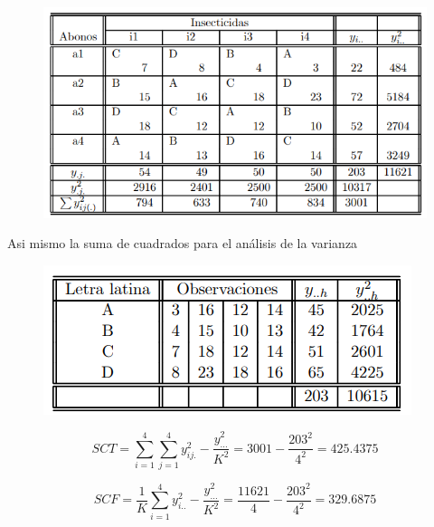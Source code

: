 \begin{figure}[H]
    \begin{tcolorbox}[colback=white, colframe=black, boxrule=1.5pt, sharp corners=all]
          \begin{center}
            {\includegraphics[scale=1]{images/img2.png}}
          \end{center}
        \end{tcolorbox}
\end{figure}

Asi mismo la suma de cuadrados para el análisis de la varianza

\begin{figure}[H]
    \begin{tcolorbox}[colback=white, colframe=black, boxrule=1.5pt, sharp corners=all]
          \begin{center}
            {\includegraphics[scale=1.5]{images/img3.png}}
          \end{center}
        \end{tcolorbox}
\end{figure}

$$
SCT = \sum_{i=1}^{4} \sum_{j=1}^{4} {y}_{ij.}^{2} - \frac{{y}_{\ldots}^{2}}{K^2} = 3001 - \frac{203^2}{4^2} = 425.4375
$$

$$
SCF = \frac{1}{K} \sum_{i=1}^{4}{y}_{i..}^{2} - \frac{{y}_{\ldots}^{2}}{K^2} = \frac{11621}{4} - \frac{203^2}{4^2} = 329.6875
$$


